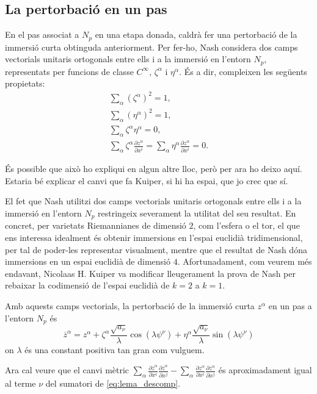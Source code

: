 \subsection{La pertorbació en un pas}
En el pas associat a $N_p$ en una etapa donada, caldrà fer una pertorbació de la immersió curta obtinguda anteriorment. Per fer-ho, Nash considera dos camps vectorials unitaris ortogonals entre ells i a la immersió en l'entorn $N_p$, representats per funcions de classe $C^\infty$, $\zeta^\alpha$ i $\eta^\alpha$. És a dir, compleixen les següents propietats:
\begin{align}
    \sum_\alpha (\zeta^\alpha)^2 = 1, \\
    \sum_\alpha (\eta^\alpha)^2 = 1, \\
    \sum_\alpha \zeta^\alpha\eta^\alpha = 0, \\
    \sum_\alpha \zeta^\alpha\frac{\partial z^\alpha}{\partial x^i} = \sum_\alpha \eta^\alpha\frac{\partial z^\alpha}{\partial x^i} = 0.
\end{align}
\begin{obs}
    {\color{blue} És possible que això ho expliqui en algun altre lloc, però per ara ho deixo aquí. Estaria bé explicar el canvi que fa Kuiper, si hi ha espai, que jo crec que sí.}

    El fet que Nash utilitzi dos camps vectorials unitaris ortogonals entre ells i a la immersió en l'entorn $N_p$ restringeix severament la utilitat del seu resultat. En concret, per varietats Riemannianes de dimensió $2$, com l'esfera o el tor, el que ens interessa idealment és obtenir immersions en l'espai euclidià tridimensional, per tal de poder-les representar visualment, mentre que el resultat de Nash dóna immersions en un espai euclidià de dimensió $4$. Afortunadament, com veurem més endavant, Nicolaas H. Kuiper va modificar lleugerament la prova de Nash per rebaixar la codimensió de l'espai euclidià de $k=2$ a $k=1$.
\end{obs}

Amb aquests camps vectorials, la pertorbació de la immersió curta $z^\alpha$ en un pas a l'entorn $N_p$ és
\begin{equation}\label{eq:pertorbacio}
    \boxed{\overline{z}^\alpha = z^\alpha + \zeta^\alpha\frac{\sqrt{a_\nu}}{\lambda}\cos(\lambda \psi^\nu) + \eta^\alpha\frac{\sqrt{a_\nu}}{\lambda}\sin(\lambda \psi^\nu)}
\end{equation}
on $\lambda$ és una constant positiva tan gran com vulguem.

Ara cal veure que el canvi mètric $\sum_\alpha\frac{\partial\overline{z}^\alpha}{\partial x^i}\frac{\partial\overline{z}^\alpha}{\partial x^j}-\sum_\alpha\frac{\partial z^\alpha}{\partial x^i}\frac{\partial z^\alpha}{\partial x^j}$ és aproximadament igual al terme $\nu$ del sumatori de \ref{eq:lema_descomp}.

